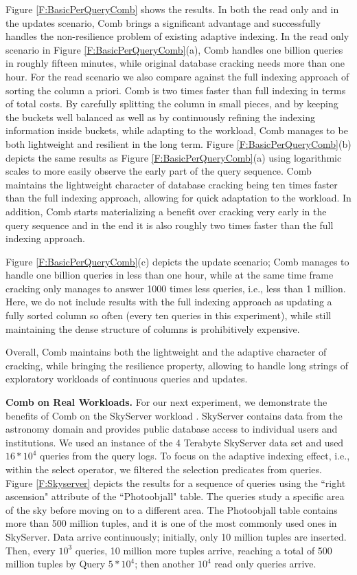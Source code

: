 Figure \ref{F:BasicPerQueryComb} shows the results. 
In both the read only and in the updates scenario, Comb brings a significant advantage
and successfully handles the non-resilience problem of existing adaptive indexing. 
In the read only scenario in Figure \ref{F:BasicPerQueryComb}(a), 
Comb handles one billion queries in roughly fifteen minutes, while original database cracking
needs more than one hour. For the read scenario we also compare against the full indexing approach of sorting the 
column a priori. Comb is two times faster than full indexing in terms of total costs.
By carefully splitting the column in small pieces, and by keeping the buckets 
well balanced as well as 
by continuously refining the indexing information inside buckets, while adapting to the workload, Comb manages to be 
both lightweight and resilient in the long term.
Figure \ref{F:BasicPerQueryComb}(b) depicts the same results as Figure \ref{F:BasicPerQueryComb}(a) using 
logarithmic scales to more easily observe the early part of the query sequence.
Comb maintains the lightweight character of database cracking being ten times faster than the full indexing approach,
allowing for quick adaptation to the workload.
In addition, Comb starts materializing a benefit over cracking very early in the query sequence 
and in the end it is also roughly two times faster than the full indexing approach.

Figure \ref{F:BasicPerQueryComb}(c) depicts the update scenario; Comb manages to handle one billion queries in less than
one hour, while at the same time frame cracking only manages to answer 1000 times less queries, i.e., less than 1 million. 
Here, we do not include results with the full indexing approach as updating
a fully sorted column so often (every ten queries in this experiment), 
while still maintaining the dense structure of columns is prohibitively expensive.

Overall, Comb maintains both the lightweight and the adaptive character of cracking, while
bringing the resilience property, allowing to handle long strings of exploratory workloads
of continuous queries and updates.



\textbf{Comb on Real Workloads.}
For our next experiment, we demonstrate the benefits of Comb on
the SkyServer workload \cite{SkyServer}. SkyServer contains data from the astronomy domain 
and provides public database access to individual users and institutions.
We used an instance of the 4 Terabyte SkyServer data set and used $16*10^4$ queries from the query logs.
To focus on the adaptive indexing effect, i.e., within the select operator,
we filtered the selection predicates from queries.
Figure \ref{F:Skyserver} depicts the results for a sequence 
of queries using the ``right ascension" attribute of the ``Photoobjall" table.
The queries study a specific area of the sky
before moving on to a different area.
The Photoobjall table contains more than 500 million tuples, and it is one of the most commonly used ones in SkyServer. 
Data arrive continuously;
initially, only 10 million tuples are inserted. Then, every $10^3$ queries, 10 million more tuples arrive, reaching a total
of 500 million tuples by Query $5*10^4$; then another $10^4$ read only queries arrive.

